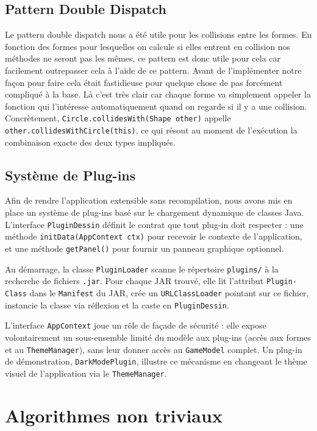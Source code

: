 \documentclass{article}
\begin{document}
\subsection{Pattern Double Dispatch}
Le pattern double dispatch nous a été utile pour les collisions entre les formes. En fonction des formes pour lesquelles on calcule si elles entrent en collision nos méthodes ne seront pas les mêmes, ce pattern est donc utile pour cela car facilement outrepasser cela à l'aide de ce pattern. Avant de l'implémenter notre façon pour faire cela était fastidieuse pour quelque chose de pas forcément compliqué à la base. Là c'est très clair car chaque forme va simplement appeler la fonction qui l'intéresse automatiquement quand on regarde si il y a une collision. Concrètement, \texttt{Circle.collidesWith(Shape other)} appelle \texttt{other.collidesWithCircle(this)}, ce qui résout au moment de l'exécution la combinaison exacte des deux types impliqués.

\subsection{Système de Plug-ins}
Afin de rendre l'application extensible sans recompilation, nous avons mis en place un système de plug-ins basé sur le chargement dynamique de classes Java. L'interface \texttt{PluginDessin} définit le contrat que tout plug-in doit respecter : une méthode \texttt{initData(AppContext ctx)} pour recevoir le contexte de l'application, et une méthode \texttt{getPanel()} pour fournir un panneau graphique optionnel.

Au démarrage, la classe \texttt{PluginLoader} scanne le répertoire \texttt{plugins/} à la recherche de fichiers \texttt{.jar}. Pour chaque JAR trouvé, elle lit l'attribut \texttt{Plugin-Class} dans le \texttt{Manifest} du JAR, crée un \texttt{URLClassLoader} pointant sur ce fichier, instancie la classe via réflexion et la caste en \texttt{PluginDessin}.

L'interface \texttt{AppContext} joue un rôle de façade de sécurité : elle expose volontairement un sous-ensemble limité du modèle aux plug-ins (accès aux formes et au \texttt{ThemeManager}), sans leur donner accès au \texttt{GameModel} complet. Un plug-in de démonstration, \texttt{DarkModePlugin}, illustre ce mécanisme en changeant le thème visuel de l'application via le \texttt{ThemeManager}.

\section{Algorithmes non triviaux}
\end{document}
